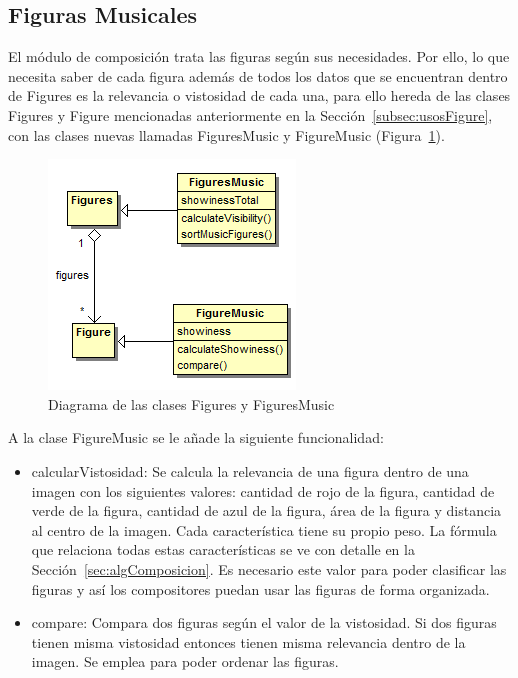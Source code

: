 \subsection{Figuras Musicales}

El módulo de composición trata las figuras según sus necesidades. Por ello, lo que necesita saber de cada figura además de todos los datos que se encuentran dentro de Figures es la relevancia o vistosidad de cada una, para ello hereda de las clases Figures y Figure mencionadas anteriormente en la Sección~\ref{subsec:usosFigure}, con las clases nuevas llamadas FiguresMusic y FigureMusic (Figura~\ref{fig:diagramaClasesFigureMusic}).

		\begin{figure}[!htbp]
		\centering
		\includegraphics[scale=0.6]{graphics/diagramaClasesFigureMusic.png}
		\caption{Diagrama de las clases Figures y FiguresMusic}
		\label{fig:diagramaClasesFigureMusic}
		\end{figure}

A la clase FigureMusic se le añade la siguiente funcionalidad:

\begin{itemize}

	\item{calcularVistosidad}: Se calcula la relevancia de una figura dentro de una imagen con los siguientes valores: cantidad de rojo de la figura, cantidad de verde de la figura, cantidad de azul de la figura, área de la figura y distancia al centro de la imagen. Cada característica tiene su propio peso. La fórmula que relaciona todas estas características se ve con detalle en la Sección~\ref{sec:algComposicion}. Es necesario este valor para poder clasificar las figuras y así los compositores puedan usar las figuras de forma organizada.

	\item{compare}: Compara dos figuras según el valor de la vistosidad. Si dos figuras tienen misma vistosidad entonces tienen misma relevancia dentro de la imagen. Se emplea para poder ordenar las figuras.

\end{itemize}

